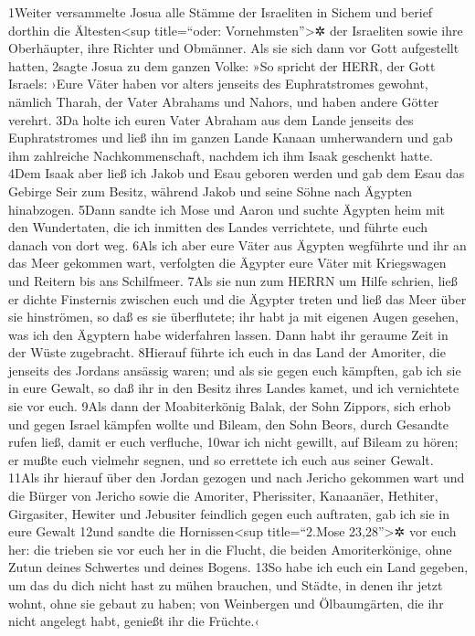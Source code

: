 1Weiter versammelte Josua alle Stämme der Israeliten in Sichem und
berief dorthin die Ältesten\textless sup title=``oder:
Vornehmsten''\textgreater✲ der Israeliten sowie ihre Oberhäupter, ihre
Richter und Obmänner. Als sie sich dann vor Gott aufgestellt hatten,
2sagte Josua zu dem ganzen Volke: »So spricht der HERR, der Gott
Israels: ›Eure Väter haben vor alters jenseits des Euphratstromes
gewohnt, nämlich Tharah, der Vater Abrahams und Nahors, und haben andere
Götter verehrt. 3Da holte ich euren Vater Abraham aus dem Lande jenseits
des Euphratstromes und ließ ihn im ganzen Lande Kanaan umherwandern und
gab ihm zahlreiche Nachkommenschaft, nachdem ich ihm Isaak geschenkt
hatte. 4Dem Isaak aber ließ ich Jakob und Esau geboren werden und gab
dem Esau das Gebirge Seir zum Besitz, während Jakob und seine Söhne nach
Ägypten hinabzogen. 5Dann sandte ich Mose und Aaron und suchte Ägypten
heim mit den Wundertaten, die ich inmitten des Landes verrichtete, und
führte euch danach von dort weg. 6Als ich aber eure Väter aus Ägypten
wegführte und ihr an das Meer gekommen wart, verfolgten die Ägypter eure
Väter mit Kriegswagen und Reitern bis ans Schilfmeer. 7Als sie nun zum
HERRN um Hilfe schrien, ließ er dichte Finsternis zwischen euch und die
Ägypter treten und ließ das Meer über sie hinströmen, so daß es sie
überflutete; ihr habt ja mit eigenen Augen gesehen, was ich den Ägyptern
habe widerfahren lassen. Dann habt ihr geraume Zeit in der Wüste
zugebracht. 8Hierauf führte ich euch in das Land der Amoriter, die
jenseits des Jordans ansässig waren; und als sie gegen euch kämpften,
gab ich sie in eure Gewalt, so daß ihr in den Besitz ihres Landes kamet,
und ich vernichtete sie vor euch. 9Als dann der Moabiterkönig Balak, der
Sohn Zippors, sich erhob und gegen Israel kämpfen wollte und Bileam, den
Sohn Beors, durch Gesandte rufen ließ, damit er euch verfluche, 10war
ich nicht gewillt, auf Bileam zu hören; er mußte euch vielmehr segnen,
und so errettete ich euch aus seiner Gewalt. 11Als ihr hierauf über den
Jordan gezogen und nach Jericho gekommen wart und die Bürger von Jericho
sowie die Amoriter, Pherissiter, Kanaanäer, Hethiter, Girgasiter,
Hewiter und Jebusiter feindlich gegen euch auftraten, gab ich sie in
eure Gewalt 12und sandte die Hornissen\textless sup title=``2.Mose
23,28''\textgreater✲ vor euch her: die trieben sie vor euch her in die
Flucht, die beiden Amoriterkönige, ohne Zutun deines Schwertes und
deines Bogens. 13So habe ich euch ein Land gegeben, um das du dich nicht
hast zu mühen brauchen, und Städte, in denen ihr jetzt wohnt, ohne sie
gebaut zu haben; von Weinbergen und Ölbaumgärten, die ihr nicht angelegt
habt, genießt ihr die Früchte.‹

